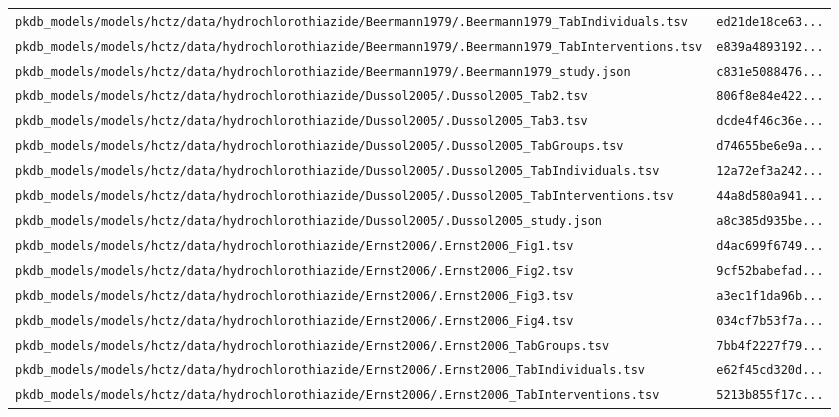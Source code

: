\documentclass{article}
\begin{document}
\begin{longtable}{ll}
\texttt{pkdb\_models/models/hctz/data/hydrochlorothiazide/Beermann1979/.Beermann1979\_TabIndividuals.tsv} & \texttt{ed21de18ce63...} \\
\texttt{pkdb\_models/models/hctz/data/hydrochlorothiazide/Beermann1979/.Beermann1979\_TabInterventions.tsv} & \texttt{e839a4893192...} \\
\texttt{pkdb\_models/models/hctz/data/hydrochlorothiazide/Beermann1979/.Beermann1979\_study.json} & \texttt{c831e5088476...} \\
\texttt{pkdb\_models/models/hctz/data/hydrochlorothiazide/Dussol2005/.Dussol2005\_Tab2.tsv} & \texttt{806f8e84e422...} \\
\texttt{pkdb\_models/models/hctz/data/hydrochlorothiazide/Dussol2005/.Dussol2005\_Tab3.tsv} & \texttt{dcde4f46c36e...} \\
\texttt{pkdb\_models/models/hctz/data/hydrochlorothiazide/Dussol2005/.Dussol2005\_TabGroups.tsv} & \texttt{d74655be6e9a...} \\
\texttt{pkdb\_models/models/hctz/data/hydrochlorothiazide/Dussol2005/.Dussol2005\_TabIndividuals.tsv} & \texttt{12a72ef3a242...} \\
\texttt{pkdb\_models/models/hctz/data/hydrochlorothiazide/Dussol2005/.Dussol2005\_TabInterventions.tsv} & \texttt{44a8d580a941...} \\
\texttt{pkdb\_models/models/hctz/data/hydrochlorothiazide/Dussol2005/.Dussol2005\_study.json} & \texttt{a8c385d935be...} \\
\texttt{pkdb\_models/models/hctz/data/hydrochlorothiazide/Ernst2006/.Ernst2006\_Fig1.tsv} & \texttt{d4ac699f6749...} \\
\texttt{pkdb\_models/models/hctz/data/hydrochlorothiazide/Ernst2006/.Ernst2006\_Fig2.tsv} & \texttt{9cf52babefad...} \\
\texttt{pkdb\_models/models/hctz/data/hydrochlorothiazide/Ernst2006/.Ernst2006\_Fig3.tsv} & \texttt{a3ec1f1da96b...} \\
\texttt{pkdb\_models/models/hctz/data/hydrochlorothiazide/Ernst2006/.Ernst2006\_Fig4.tsv} & \texttt{034cf7b53f7a...} \\
\texttt{pkdb\_models/models/hctz/data/hydrochlorothiazide/Ernst2006/.Ernst2006\_TabGroups.tsv} & \texttt{7bb4f2227f79...} \\
\texttt{pkdb\_models/models/hctz/data/hydrochlorothiazide/Ernst2006/.Ernst2006\_TabIndividuals.tsv} & \texttt{e62f45cd320d...} \\
\texttt{pkdb\_models/models/hctz/data/hydrochlorothiazide/Ernst2006/.Ernst2006\_TabInterventions.tsv} & \texttt{5213b855f17c...} \\

\end{longtable}
\end{document}
